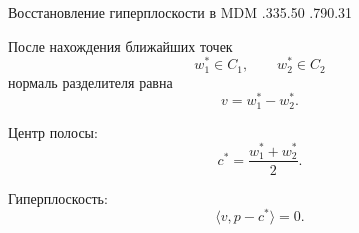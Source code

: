 \SPBGSplitSlide
  {Восстановление гиперплоскости в MDM}
  {.335}{.50}
  {%
    \ReportMdmBridge
  }
  {.790}{.31}
  {%
    \SplitBody
    После нахождения ближайших точек
    \[
      w_1^*\in C_1,\qquad w_2^*\in C_2
    \]
    нормаль разделителя равна
    \[
      v=w_1^*-w_2^*.
    \]

    Центр полосы:
    \[
      c^*=\frac{w_1^*+w_2^*}{2}.
    \]

    Гиперплоскость:
    \[
      \langle v,p-c^*\rangle=0.
    \]
  }
